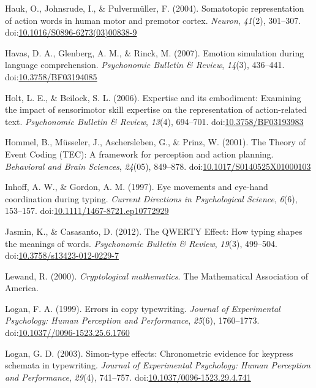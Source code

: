 \documentclass[english,man]{apa6}
\theoremstyle{definition}
\theoremstyle{definition}
\theoremstyle{definition}
\theoremstyle{remark}
\begin{document}
\hypertarget{ref-Hauk2004}{}
Hauk, O., Johnsrude, I., \& Pulvermüller, F. (2004). Somatotopic
representation of action words in human motor and premotor cortex.
\emph{Neuron}, \emph{41}(2), 301--307.
doi:\href{https://doi.org/10.1016/S0896-6273(03)00838-9}{10.1016/S0896-6273(03)00838-9}

\hypertarget{ref-Havas2007}{}
Havas, D. A., Glenberg, A. M., \& Rinck, M. (2007). Emotion simulation
during language comprehension. \emph{Psychonomic Bulletin \& Review},
\emph{14}(3), 436--441.
doi:\href{https://doi.org/10.3758/BF03194085}{10.3758/BF03194085}

\hypertarget{ref-Holt2006}{}
Holt, L. E., \& Beilock, S. L. (2006). Expertise and its embodiment:
Examining the impact of sensorimotor skill expertise on the
representation of action-related text. \emph{Psychonomic Bulletin \&
Review}, \emph{13}(4), 694--701.
doi:\href{https://doi.org/10.3758/BF03193983}{10.3758/BF03193983}

\hypertarget{ref-Hommel2001}{}
Hommel, B., Müsseler, J., Aschersleben, G., \& Prinz, W. (2001). The
Theory of Event Coding (TEC): A framework for perception and action
planning. \emph{Behavioral and Brain Sciences}, \emph{24}(05), 849--878.
doi:\href{https://doi.org/10.1017/S0140525X01000103}{10.1017/S0140525X01000103}

\hypertarget{ref-Inhoff1997}{}
Inhoff, A. W., \& Gordon, A. M. (1997). Eye movements and eye-hand
coordination during typing. \emph{Current Directions in Psychological
Science}, \emph{6}(6), 153--157.
doi:\href{https://doi.org/10.1111/1467-8721.ep10772929}{10.1111/1467-8721.ep10772929}

\hypertarget{ref-Jasmin2012}{}
Jasmin, K., \& Casasanto, D. (2012). The QWERTY Effect: How typing
shapes the meanings of words. \emph{Psychonomic Bulletin \& Review},
\emph{19}(3), 499--504.
doi:\href{https://doi.org/10.3758/s13423-012-0229-7}{10.3758/s13423-012-0229-7}

\hypertarget{ref-Lewand2000}{}
Lewand, R. (2000). \emph{Cryptological mathematics}. The Mathematical
Association of America.

\hypertarget{ref-Logan1999}{}
Logan, F. A. (1999). Errors in copy typewriting. \emph{Journal of
Experimental Psychology: Human Perception and Performance},
\emph{25}(6), 1760--1773.
doi:\href{https://doi.org/10.1037//0096-1523.25.6.1760}{10.1037//0096-1523.25.6.1760}

\hypertarget{ref-Logan2003}{}
Logan, G. D. (2003). Simon-type effects: Chronometric evidence for
keypress schemata in typewriting. \emph{Journal of Experimental
Psychology: Human Perception and Performance}, \emph{29}(4), 741--757.
doi:\href{https://doi.org/10.1037/0096-1523.29.4.741}{10.1037/0096-1523.29.4.741}
\end{document}
